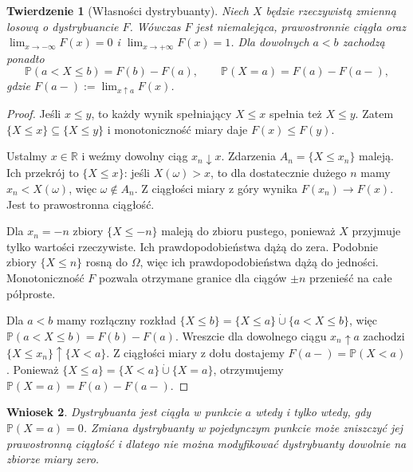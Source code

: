 \documentclass[11pt,a4paper,oneside]{report}
\numberwithin{equation}{chapter}
\theoremstyle{plain}
\newtheorem{twierdzenie}{Twierdzenie}[chapter]
\newtheorem{wniosek}[twierdzenie]{Wniosek}
\theoremstyle{definition}
\theoremstyle{remark}
\newcommand{\R}{\mathbb{R}}
\newcommand{\Prob}{\mathbb{P}}
\begin{document}
\begin{twierdzenie}[Własności dystrybuanty]
Niech $X$ będzie rzeczywistą zmienną losową o dystrybuancie $F$.
Wówczas $F$ jest niemalejąca, prawostronnie ciągła oraz
$\lim_{x\to-\infty}F(x)=0$ i $\lim_{x\to+\infty}F(x)=1$.
Dla dowolnych $a<b$ zachodzą ponadto
\[
\Prob(a<X\leq b)=F(b)-F(a),\qquad
\Prob(X=a)=F(a)-F(a-),
\]
gdzie $F(a-):=\lim_{x\uparrow a}F(x)$.
\end{twierdzenie}
\begin{proof}
Jeśli $x\leq y$, to każdy wynik spełniający $X\leq x$
spełnia też $X\leq y$. Zatem
$\{X\leq x\}\subseteq\{X\leq y\}$ i monotoniczność
miary daje $F(x)\leq F(y)$.

Ustalmy $x\in\R$ i weźmy dowolny ciąg $x_n\downarrow x$.
Zdarzenia $A_n=\{X\leq x_n\}$ maleją. Ich przekrój
to $\{X\leq x\}$: jeśli $X(\omega)>x$, to dla
dostatecznie dużego $n$ mamy $x_n<X(\omega)$,
więc $\omega\notin A_n$. Z ciągłości miary z góry
wynika $F(x_n)\to F(x)$. Jest to prawostronna ciągłość.

Dla $x_n=-n$ zbiory $\{X\leq-n\}$ maleją
do zbioru pustego, ponieważ $X$ przyjmuje tylko
wartości rzeczywiste. Ich prawdopodobieństwa dążą do zera.
Podobnie zbiory $\{X\leq n\}$ rosną do $\Omega$,
więc ich prawdopodobieństwa dążą do jedności.
Monotoniczność $F$ pozwala otrzymane granice dla
ciągów $\pm n$ przenieść na całe półproste.

Dla $a<b$ mamy rozłączny rozkład
$\{X\leq b\}=\{X\leq a\}\mathbin{\dot\cup}
\{a<X\leq b\}$, więc
$\Prob(a<X\leq b)=F(b)-F(a)$.
Wreszcie dla dowolnego ciągu $x_n\uparrow a$
zachodzi $\{X\leq x_n\}\uparrow\{X<a\}$.
Z ciągłości miary z dołu dostajemy
$F(a-)=\Prob(X<a)$. Ponieważ
$\{X\leq a\}=\{X<a\}\mathbin{\dot\cup}\{X=a\}$,
otrzymujemy $\Prob(X=a)=F(a)-F(a-)$.
\end{proof}

\begin{wniosek}
Dystrybuanta jest ciągła w punkcie $a$ wtedy i tylko wtedy,
gdy $\Prob(X=a)=0$. Zmiana dystrybuanty w pojedynczym punkcie
może zniszczyć jej prawostronną ciągłość i dlatego nie można
modyfikować dystrybuanty dowolnie na zbiorze miary zero.
\end{wniosek}
\end{document}
